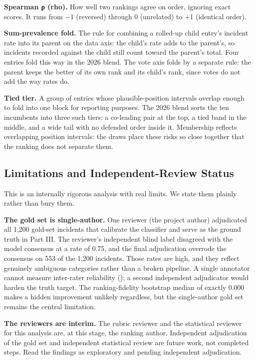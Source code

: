 \documentclass[11pt]{article}
\begin{document}
\textbf{Spearman ρ (rho).} How well two rankings agree on order,
ignoring exact scores. It runs from −1 (reversed) through 0 (unrelated)
to +1 (identical order).

\textbf{Sum-prevalence fold.} The rule for combining a rolled-up child
entry's incident rate into its parent on the data axis: the child's rate
adds to the parent's, so incidents recorded against the child still
count toward the parent's total. Four entries fold this way in the 2026
blend. The vote axis folds by a separate rule: the parent keeps the
better of its own rank and its child's rank, since votes do not add the
way rates do.

\textbf{Tied tier.} A group of entries whose plausible-position
intervals overlap enough to fold into one block for reporting purposes.
The 2026 blend sorts the ten incumbents into three such tiers: a
co-leading pair at the top, a tied band in the middle, and a wide tail
with no defended order inside it. Membership reflects overlapping
position intervals: the draws place these risks so close together that
the ranking does not separate them.

\subsection{Limitations and Independent-Review
Status}\label{limitations-and-independent-review-status}

This is an internally rigorous analysis with real limits. We state them
plainly rather than bury them.

\textbf{The gold set is single-author.} One reviewer (the project
author) adjudicated all 1,200 gold-set incidents that calibrate the
classifier and serve as the ground truth in Part III. The reviewer's
independent blind label disagreed with the model consensus at a rate of
0.75, and the final adjudication overrode the consensus on 553 of the
1,200 incidents. Those rates are high, and they reflect genuinely
ambiguous categories rather than a broken pipeline. A single annotator
cannot measure inter-rater reliability (); a second independent adjudicator would harden the truth target.
The ranking-fidelity bootstrap median of exactly 0.000 makes a hidden
improvement unlikely regardless, but the single-author gold set remains
the central limitation.

\textbf{The reviewers are interim.} The rubric reviewer and the
statistical reviewer for this analysis are, at this stage, the ranking
author. Independent adjudication of the gold set and independent
statistical review are future work, not completed steps. Read the
findings as exploratory and pending independent adjudication.
\end{document}
